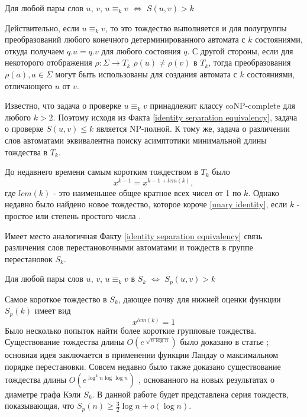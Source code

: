 \begin{fact} \label{identity separation equivalency}
	Для любой пары слов $u$, $v$, $u \equiv_k v$ $ \iff $ $S(u, v) > k$
\end{fact}

Действительно, если $u \equiv_k v$, то это тождество выполняется и для полугруппы преобразований любого конечного детерминированного автомата с $k$ состояниями, откуда получаем $q.u = q.v$ для любого состояния $q$. С другой стороны, если для некоторого отображения $\rho: \Sigma \rightarrow T_k$ $\rho(u) \ne \rho(v)$ в $T_k$, тогда преобразования $\rho(a), a \in \Sigma$ могут быть использованы для создания автомата с $k$ состояниями, отличающего $u$ от $v$.

Известно, что задача о проверке $u \equiv_k v$ принадлежит классу coNP-complete для любого $k > 2$. Поэтому исходя из Факта \ref{identity separation equivalency}, задача о проверке $S(u, v) \le k$ является NP-полной. К тому же, задача о различении слов автоматами эквивалентна поиску асимптотики минимальной длины тождества в $T_k$.

До недавнего времени самым коротким тождеством в $T_k$ было 
\begin{equation} \label{unary identity}
	x^{k-1} = x^{k-1+lcm(k)},
\end{equation} 
где $lcm(k)$ - это наименьшее общее кратное всех чисел от 1 по $k$. Однако недавно было найдено новое тождество, которое короче \ref{unary identity}, если $k$ - простое или степень простого числа \cite{lower bounds}.

Имеет место аналогичная Факту \ref{identity separation equivalency} связь различения слов перестановочными автоматами и тождеств в группе перестановок $S_k$.

\begin{fact}
	Для любой пары слов $u$, $v$, $u \equiv_k v$ в $S_k$ $ \iff $ $S_p(u, v) > k$
\end{fact}

Самое короткое тождество в $S_k$, дающее почву для нижней оценки функции $S_p(k)$ имеет вид 
$$
	x^{lcm(k)} = 1
$$
Было несколько попыток найти более короткие групповые тождества. Существование тождества длины $O(e^{\sqrt[]{n \log n}})$ было доказано в статье \cite{short group identity 1}; основная идея заключается в применении функции Ландау о максимальном порядке перестановки. Совсем недавно было также доказано существование тождества длины $O(e^{\log^4 n \log \log n})$ \cite{short group identity diameter of Caleys graph}, основанного на новых результатах о диаметре графа Кэли $S_k$. В данной работе будет представлена серия тождеств, показывающая, что $S_p(n) \ge \frac{3}{2}\log n + o(\log n)$.

